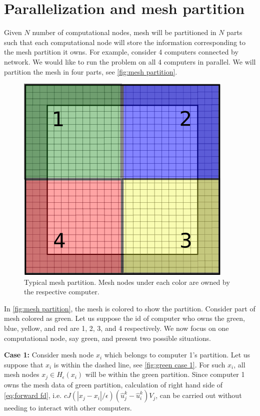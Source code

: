 \documentclass[11pt,twocolumn]{amsart}
\theoremstyle{definition}
\theoremstyle{definition}
\numberwithin{equation}{section}
\numberwithin{equation}{section}
\begin{document}
\section{Parallelization and mesh partition}
Given $N$ number of computational nodes, mesh will be partitioned in $N$ parts such that each computational node will store the information corresponding to the mesh partition it owns. For example, consider 4 computers connected by network. We would like to run the problem on all 4 computers in parallel. We will partition the mesh in four parts, see \autoref{fig:mesh partition}.

\begin{figure}
\centering
\includegraphics[scale=0.6]{mesh_partition.png}
\caption{Typical mesh partition. Mesh nodes under each color are owned by the respective computer.}\label{fig:mesh partition}
\end{figure}

In \autoref{fig:mesh partition}, the mesh is colored to show the partition. Consider part of mesh colored as green. Let us suppose the id of computer who owns the green, blue, yellow, and red are 1, 2, 3, and 4 respectively. We now focus on one computational node, say green, and present two possible situations.

\textbf{Case 1: }Consider mesh node $x_i$ which belongs to computer 1's partition. Let us suppose that $x_i$ is within the dashed line, see \autoref{fig:green case 1}. For such $x_i$, all mesh nodes $x_j \in H_\epsilon(x_i)$  will be within the green partition. Since computer 1 owns the mesh data of green partition, calculation of right hand side of \autoref{eq:forward fd}, i.e. $c J(|x_j - x_i|/\epsilon)(\hat{u}^k_j - \hat{u}^k_i)V_j$, can be carried out without needing to interact with other computers. 
\end{document}
